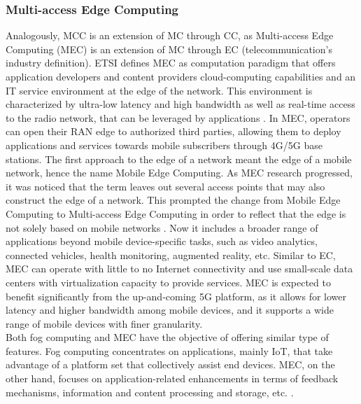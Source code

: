 \subsubsection{Multi-access Edge Computing}
Analogously, MCC is an extension of MC through CC, as Multi-access Edge Computing (MEC) is an extension of MC through EC (telecommunication's industry definition). ETSI defines MEC as computation paradigm that offers application developers and content providers cloud-computing capabilities and an IT service environment at the edge of the network. This environment is characterized by ultra-low latency and high bandwidth as well as real-time access to the radio network, that can be leveraged by applications \cite{ETSIMult81:online}. In MEC, operators can open their RAN edge to authorized third parties, allowing them to deploy applications and services towards mobile subscribers through 4G/5G base stations. The first approach to the edge of a network meant the edge of a mobile network, hence the name Mobile Edge Computing. As MEC research progressed, it was noticed that the term leaves out several access points that may also construct the edge of a network. This prompted the change from Mobile Edge Computing to Multi-access Edge Computing in order to reflect that the edge is not solely based on mobile networks \cite{MobileEd74:online}. Now it includes a broader range of applications beyond mobile device-specific tasks, such as video analytics, connected vehicles, health monitoring, augmented reality, etc. Similar to EC, MEC can operate with little to no Internet connectivity and use small-scale data centers with virtualization capacity to provide services. MEC is expected to benefit significantly from the up-and-coming 5G platform, as it allows for lower latency and higher bandwidth among mobile devices, and it supports a wide range of mobile devices with finer granularity.\\
\noindent\tab Both fog computing and MEC have the objective of offering similar type of features. Fog computing concentrates on applications, mainly IoT, that take advantage of a platform set that collectively assist end devices. MEC, on the other hand, focuses on application-related enhancements in terms of feedback mechanisms, information and content processing and storage, etc. \cite{taleb2017multi}.

